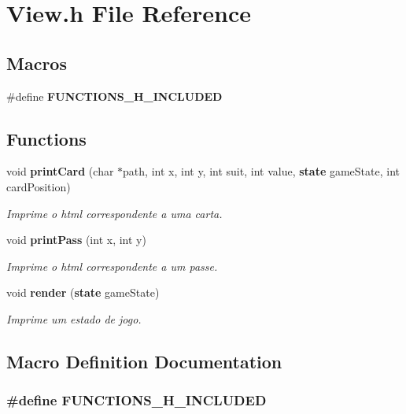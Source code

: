 \section{View.\+h File Reference}
\label{_view_8h}
\subsection*{Macros}
\begin{DoxyCompactItemize}
\item 
\#define {\bf F\+U\+N\+C\+T\+I\+O\+N\+S\+\_\+\+H\+\_\+\+I\+N\+C\+L\+U\+D\+ED}
\end{DoxyCompactItemize}
\subsection*{Functions}
\begin{DoxyCompactItemize}
\item 
void {\bf print\+Card} (char $\ast$path, int x, int y, int suit, int value, {\bf state} game\+State, int card\+Position)
\begin{DoxyCompactList}\small\item\em Imprime o html correspondente a uma carta. \end{DoxyCompactList}\item 
void {\bf print\+Pass} (int x, int y)
\begin{DoxyCompactList}\small\item\em Imprime o html correspondente a um passe. \end{DoxyCompactList}\item 
void {\bf render} ({\bf state} game\+State)
\begin{DoxyCompactList}\small\item\em Imprime um estado de jogo. \end{DoxyCompactList}\end{DoxyCompactItemize}


\subsection{Macro Definition Documentation}
\subsubsection[{F\+U\+N\+C\+T\+I\+O\+N\+S\+\_\+\+H\+\_\+\+I\+N\+C\+L\+U\+D\+ED}]{\setlength{\rightskip}{0pt plus 5cm}\#define F\+U\+N\+C\+T\+I\+O\+N\+S\+\_\+\+H\+\_\+\+I\+N\+C\+L\+U\+D\+ED}\label{_view_8h_a0cb1ce350a6ce7c926a63393b9b80692}


